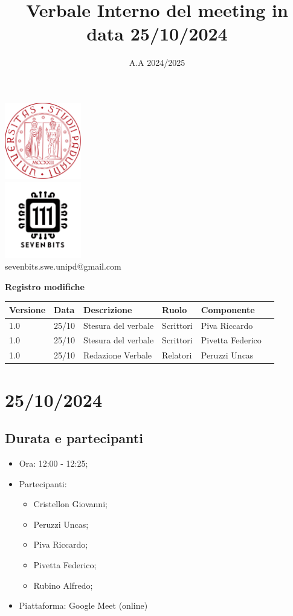 \documentclass[12pt]{article}
\title{Verbale Interno del meeting in data 25/10/2024}
\date{A.A 2024/2025}
\begin{document}
\maketitle
\center 
\includegraphics[width=0.25\textwidth]{LogoUnipd}\\
\includegraphics[width=0.25\textwidth]{Sevenbitslogo}\\
sevenbits.swe.unipd@gmail.com\\
\vspace{2mm}

\textbf{Registro modifiche}\\
\vspace{2mm}
\begin{tabular}{|l|l|l|l|l|l|}
\hline
\textbf{Versione} & \textbf{Data} & \textbf{Descrizione} & \textbf{Ruolo} & \textbf{Componente} \\
\hline
1.0 & 25/10 & Stesura del verbale & Scrittori & Piva Riccardo\\
\hline
1.0 & 25/10 &  Stesura del verbale & Scrittori & Pivetta Federico\\
\hline
1.0 & 25/10 &  Redazione Verbale & Relatori & Peruzzi Uncas\\
\hline
\end{tabular}

\raggedright
\tableofcontents
\newpage
\section{25/10/2024}
\subsection{Durata e partecipanti}
\begin{itemize}
\item Ora: 12:00 - 12:25;
\item Partecipanti: 	
	\begin{itemize}
	\item Cristellon Giovanni;
	\item Peruzzi Uncas;
	\item Piva Riccardo;
	\item Pivetta Federico;
	\item Rubino Alfredo;
	\end{itemize}
\item Piattaforma: Google Meet (online)
\end{itemize}
\end{document}
